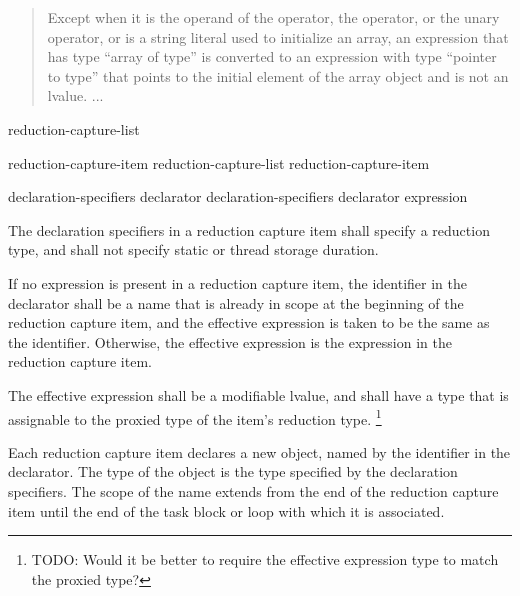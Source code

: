 \begin{quote}
Except when it
is the operand of the  operator,
the  operator,
or the unary \tcode{\&} operator,
or is a string literal used to initialize an array,
an expression that has type ``array of type''
is converted to an expression with type ``pointer to type''
that points to the initial element of the array object
and is not an lvalue. ...
\end{quote}



\begin{bnf}
\br
{} \terminal{(} reduction-capture-list \terminal{)}
\end{bnf}

\begin{bnf}
\br
reduction-capture-item
\br
reduction-capture-list \terminal{,} reduction-capture-item
\end{bnf}

\begin{bnf}
\br
declaration-specifiers declarator
\br
declaration-specifiers declarator \terminal{:} expression
\end{bnf}


\pnum
The declaration specifiers in a reduction capture item
shall specify a reduction type,
and shall not specify static or thread storage duration.

\pnum
If no expression is present in a reduction capture item,
the identifier in the declarator
shall be a name that is already in scope
at the beginning of the reduction capture item,
and the effective expression is taken to be the same as the identifier.
Otherwise, the effective expression
is the expression in the reduction capture item.

\pnum
The effective expression shall be a modifiable lvalue,
and shall have a type that is assignable to the proxied type
of the item's reduction type.
\footnote{TODO:
Would it be better to require the effective expression type
to match the proxied type?
}


\pnum
Each reduction capture item declares a new object,
named by the identifier in the declarator.
The type of the object is the type specified by the declaration specifiers.
The scope of the name extends from the end of the reduction capture item
until the end of the task block or loop with which it is associated.

